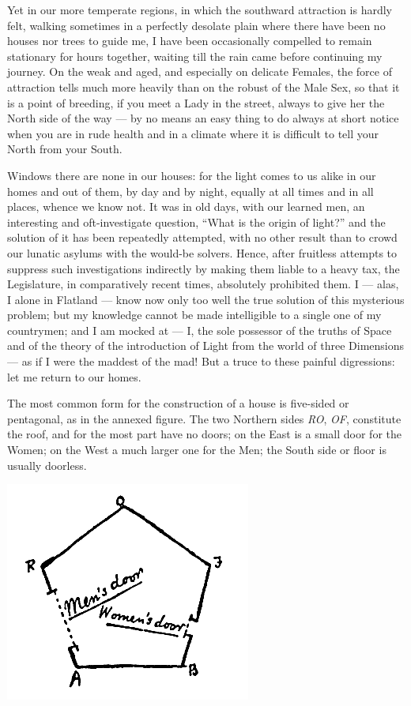 \documentclass[10pt, kindle, oneside]{kindle}
\begin{document}
Yet in our more temperate regions, in which the southward attraction is hardly
felt, walking sometimes in a perfectly desolate plain where there have been no
houses nor trees to guide me, I have been occasionally compelled to remain
stationary for hours together, waiting till the rain came before continuing my
journey. On the weak and aged, and especially on delicate Females, the force
of attraction tells much more heavily than on the robust of the Male Sex, so
that it is a point of breeding, if you meet a Lady in the street, always to
give her the North side of the way --- by no means an easy thing to do always at
short notice when you are in rude health and in a climate where it is
difficult to tell your North from your South.

Windows there are none in our houses: for the light comes to us alike in our
homes and out of them, by day and by night, equally at all times and in all
places, whence we know not. It was in old days, with our learned men, an
interesting and oft-investigate question, ``What is the origin of light?'' and
the solution of it has been repeatedly attempted, with no other result than to
crowd our lunatic asylums with the would-be solvers. Hence, after fruitless
attempts to suppress such investigations indirectly by making them liable to a
heavy tax, the Legislature, in comparatively recent times, absolutely
prohibited them. I --- alas, I alone in Flatland --- know now only too well the
true solution of this mysterious problem; but my knowledge cannot be made
intelligible to a single one of my countrymen; and I am mocked at --- I, the
sole possessor of the truths of Space and of the theory of the introduction of
Light from the world of three Dimensions --- as if I were the maddest of the
mad! But a truce to these painful digressions: let me return to our homes.

The most common form for the construction of a house is five-sided or
pentagonal, as in the annexed figure. The two Northern sides \emph{RO}, \emph{OF},
constitute the roof, and for the most part have no doors; on the East is a
small door for the Women; on the West a much larger one for the Men; the South
side or floor is usually doorless.
\begin{center}
    \includegraphics[trim=0mm 0mm 0mm 0mm, scale=0.5]{fig2}
\end{center}
\end{document}
